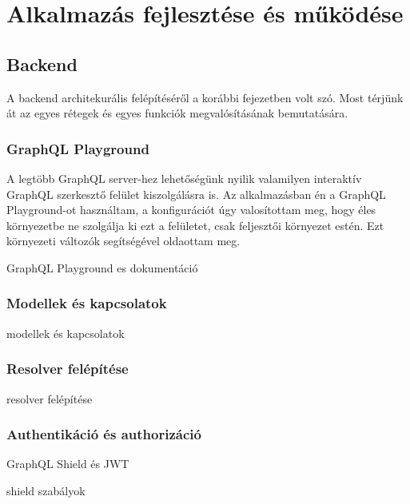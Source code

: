 
\chapter{Alkalmazás fejlesztése és működése}

\section{Backend}
A backend architekurális felépítéséről a korábbi fejezetben volt szó. 
Most térjünk át az egyes rétegek és egyes funkciók megvalósításának bemutatására.

\subsection{GraphQL Playground}
A legtöbb GraphQL server-hez lehetőségünk nyilik valamilyen interaktív GraphQL szerkesztő felület kiszolgálásra is.
Az alkalmazásban én a GraphQL Playground-ot használtam, a konfigurációt úgy valosítottam meg, hogy éles környezetbe ne szolgálja ki ezt a felületet, csak feljesztői környezet estén.
Ezt környezeti változók segítségével oldaottam meg.

GraphQL Playground es dokumentáció

\subsection{Modellek és kapcsolatok}
modellek és kapcsolatok

\subsection{Resolver felépítése}

resolver felépítése

\subsection{Authentikáció és authorizáció}
GraphQL Shield és JWT

shield szabályok

